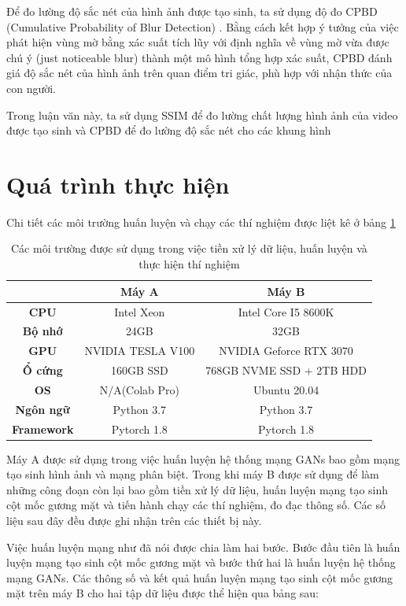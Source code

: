 Để đo lường độ sắc nét của hình ảnh được tạo sinh, ta sử dụng độ đo CPBD (Cumulative 
Probability of Blur Detection) \cite{cpbd}. Bằng cách kết hợp ý tưởng của việc phát hiện vùng mờ bằng xác suất tích lũy với định nghĩa về vùng mờ vừa được chú ý (just noticeable blur) thành một mô hình tổng hợp xác suất, CPBD đánh giá độ sắc nét của hình ảnh trên quan điểm tri giác, phù hợp với nhận thức của con người.

Trong luận văn này, ta sử dụng SSIM để đo lường chất lượng hình ảnh của video được tạo sinh và CPBD để đo lường độ sắc nét cho các khung hình

\section{Quá trình thực hiện}

Chi tiết các môi trường huấn luyện và chạy các thí nghiệm được liệt kê ở bảng \ref{table:hardware}

\begin{table}[h]
    \centering
    \begin{tabular}{c | c | c}
    \hline 
    &\textbf{Máy A} & \textbf{Máy B}\\
    \hline
    \textbf{CPU} & Intel Xeon & Intel Core I5 8600K\\
    \textbf{Bộ nhớ} & 24GB & 32GB\\
    \textbf{GPU} & NVIDIA TESLA V100 & NVIDIA Geforce RTX 3070\\
    \textbf{Ổ cứng} & 160GB SSD & 768GB NVME SSD + 2TB HDD\\
    \textbf{OS} & N/A(Colab Pro) & Ubuntu 20.04\\
    \textbf{Ngôn ngữ} & Python 3.7 & Python 3.7\\
    \textbf{Framework} & Pytorch 1.8 & Pytorch 1.8\\
    \hline
    \end{tabular}
    \caption{Các môi trường được sử dụng trong việc tiền xử lý dữ liệu, huấn luyện và thực hiện thí nghiệm}
    \label{table:hardware}
\end{table}

Máy A được sử dụng trong việc huấn luyện hệ thống mạng GANs bao gồm mạng tạo sinh hình ảnh và mạng phân biệt. Trong khi máy B được sử dụng để làm những công đoạn còn lại bao gồm tiền xử lý dữ liệu, huấn luyện mạng tạo sinh cột mốc gương mặt và tiến hành chạy các thí nghiệm, đo đạc thông số. Các số liệu sau đây đều được ghi nhận trên các thiết bị này. 

Việc huấn luyện mạng như đã nói được chia làm hai bước. Bước đầu tiên là huấn luyện mạng tạo sinh cột mốc gương mặt và bước thứ hai là huấn luyện hệ thống mạng GANs. Các thông số và kết quả huấn luyện mạng tạo sinh cột mốc gương mặt trên máy B cho hai tập dữ liệu được thể hiện qua bảng sau:

